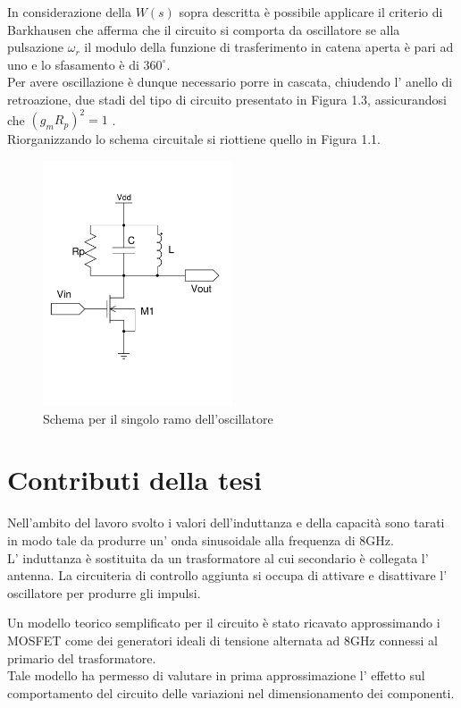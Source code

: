 \documentclass[a4paper, 12pt]{memoir}
\begin{document}
In considerazione della $ W(s) $ sopra descritta è possibile applicare il
criterio di Barkhausen\cite{JaegerMicro} che afferma che il circuito si
comporta da oscillatore se alla pulsazione $ \omega _r $ il modulo della
funzione di trasferimento in catena aperta è pari ad uno e lo sfasamento è di
$ 360^{\circ} $.\\
Per avere oscillazione è dunque necessario porre in cascata, chiudendo l'
anello di retroazione, due stadi del tipo di circuito presentato in Figura 1.3,
assicurandosi che $ {\left( g_m R_p \right)}^2 = 1 $ 
\cite[p.652]{RazaviFundamentals}.\\
Riorganizzando lo schema circuitale si riottiene quello in Figura 1.1.

\begin{figure}[h]
\centering
\includegraphics[width=0.5\textwidth]{images/LCsingle.pdf}
\caption{Schema per il singolo ramo dell'oscillatore}
\end{figure}

\section{Contributi della tesi}
Nell'ambito del lavoro svolto i valori dell'induttanza e della capacità sono
tarati in modo tale da produrre un' onda sinusoidale alla frequenza di 8GHz.\\
L' induttanza è sostituita da un trasformatore al cui secondario è collegata l'
antenna. La circuiteria di controllo aggiunta si occupa di attivare e
disattivare l' oscillatore per produrre gli impulsi.

Un modello teorico semplificato per il circuito è stato ricavato approssimando
i MOSFET come dei generatori ideali di tensione alternata ad 8GHz
connessi al primario del trasformatore. \\
Tale modello ha permesso di valutare in prima approssimazione l' effetto sul
comportamento del circuito delle variazioni nel dimensionamento dei componenti.
\end{document}
